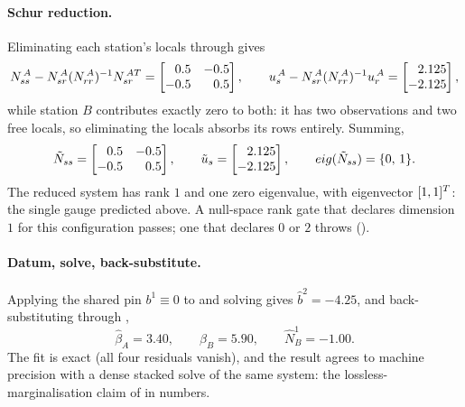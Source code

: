 \documentclass[main.tex]{subfiles}
\begin{document}
\paragraph{Schur reduction.}
Eliminating each station's locals through
 gives
\[
N_{ss}^{\,A} - N_{sr}^{\,A}(N_{rr}^{\,A})^{-1}N_{sr}^{\,AT}
  = \begin{bmatrix}\phantom{-}0.5 & -0.5\\ -0.5 & \phantom{-}0.5\end{bmatrix},
\qquad
u_s^{\,A} - N_{sr}^{\,A}(N_{rr}^{\,A})^{-1}u_r^{\,A}
  = \begin{bmatrix}\phantom{-}2.125\\ -2.125\end{bmatrix},
\]
while station $B$ contributes exactly zero to both: it has two
observations and two free locals, so eliminating the locals absorbs its
rows entirely.  Summing,
\begin{equation}
\tilde{N}_{ss} = \begin{bmatrix}\phantom{-}0.5 & -0.5\\ -0.5 & \phantom{-}0.5\end{bmatrix},
\qquad
\tilde{u}_s = \begin{bmatrix}\phantom{-}2.125\\ -2.125\end{bmatrix},
\qquad
eig(\tilde{N}_{ss}) = \{0,\,1\}.
\label{eq:carry-ex-reduced}
\end{equation}
The reduced system has rank $1$ and one zero eigenvalue, with
eigenvector $[1,1]^{T}$: the single gauge predicted above.  A
null-space rank gate that declares dimension $1$ for this configuration
passes; one that declares $0$ or $2$ throws
().

\paragraph{Datum, solve, back-substitute.}
Applying the shared pin $b^1 \equiv 0$ to
 and solving gives $\hat b^2 = -4.25$, and
back-substituting through
,
\[
\hat\beta_A = 3.40,
\qquad
\hat\beta_B = 5.90,
\qquad
\hat N^1_B = -1.00 .
\]
The fit is exact (all four residuals vanish), and the result agrees to
machine precision with a dense stacked solve of the same system: the
lossless-marginalisation claim of  in numbers.
\end{document}
